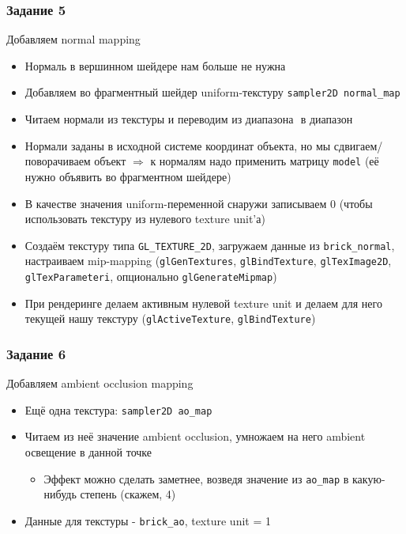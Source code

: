 \documentclass{beamer}
\begin{document}
\begin{frame}[fragile]
\frametitle{Задание 5}
\fontsize{10pt}{10pt}
Добавляем normal mapping
\begin{itemize}
\item Нормаль в вершинном шейдере нам больше не нужна
\pause
\item Добавляем во фрагментный шейдер uniform-текстуру \verb|sampler2D normal_map|
\pause
\item Читаем нормали из текстуры и переводим из диапазона \begin{math}[0, 1]\end{math} в диапазон \begin{math}[-1, 1]\end{math}
\pause
\item Нормали заданы в исходной системе координат объекта, но мы сдвигаем/поворачиваем объект \begin{math}\Rightarrow\end{math} к нормалям надо применить матрицу \verb|model| (её нужно объявить во фрагментном шейдере)
\pause
\item В качестве значения uniform-переменной снаружи записываем 0 (чтобы использовать текстуру из нулевого texture unit'а)
\pause
\item Создаём текстуру типа \verb|GL_TEXTURE_2D|, загружаем данные из \verb|brick_normal|, настраиваем mip-mapping (\verb|glGenTextures|, \verb|glBindTexture|, \verb|glTexImage2D|, \verb|glTexParameteri|, опционально \verb|glGenerateMipmap|)
\pause
\item При рендеринге делаем активным нулевой texture unit и делаем для него текущей нашу текстуру (\verb|glActiveTexture|, \verb|glBindTexture|)
\end{itemize}
\end{frame}

\begin{frame}[fragile]
\frametitle{Задание 6}
Добавляем ambient occlusion mapping
\begin{itemize}
\item Ещё одна текстура: \verb|sampler2D ao_map|
\pause
\item Читаем из неё значение ambient occlusion, умножаем на него ambient освещение в данной точке
\begin{itemize}
\item Эффект можно сделать заметнее, возведя значение из \verb|ao_map| в какую-нибудь степень (скажем, 4)
\end{itemize}
\pause
\item Данные для текстуры - \verb|brick_ao|, texture unit = 1
\end{itemize}
\end{frame}
\end{document}
